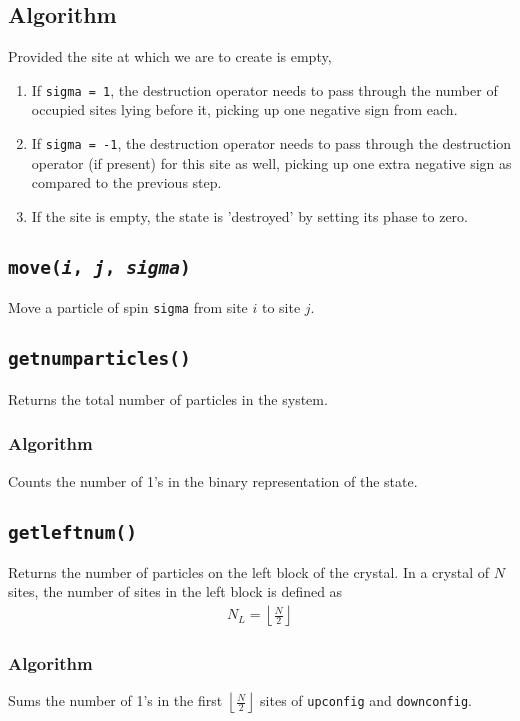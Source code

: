 \documentclass[]{book}
\begin{document}
\subsection*{Algorithm}
Provided the site at which we are to create is empty,
\begin{enumerate}
\item If \texttt{sigma = 1}, the destruction operator needs to pass through the number of occupied sites lying before it, picking up one negative sign from each.
	
\item If \texttt{sigma = -1}, the destruction operator needs to pass through the destruction operator (if present) for this site as well, picking up one extra negative sign as compared to the previous step.
	
\item If the site is empty, the state is 'destroyed' by setting its phase to zero.

\end{enumerate}

\subsection{\texttt{move(\textit{i}, \textit{j}, \textit{sigma})}}
Move a particle of spin \texttt{sigma} from site $i$ to site $j$.

\subsection{\texttt{getnumparticles()}}
Returns the total number of particles in the system.
\subsubsection*{Algorithm}
Counts the number of 1's in the binary representation of the state.

\subsection{\texttt{getleftnum()}}
Returns the number of particles on the left block of the crystal. In a crystal of $N$ sites, the number of sites in the left block is defined as
\begin{align}
N_L = \left\lfloor \frac{N}{2} \right\rfloor
\end{align}

\subsubsection{Algorithm}
Sums the number of 1's in the first $\left\lfloor \frac{N}{2} \right\rfloor$ sites of \texttt{upconfig} and \texttt{downconfig}.
\end{document}
